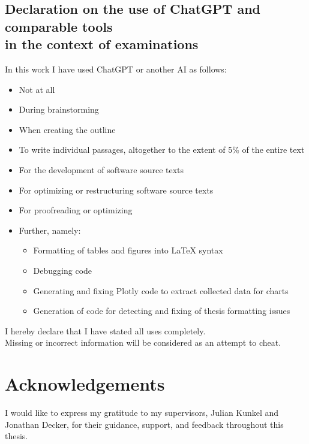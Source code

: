 \subsection*{Declaration on the use of ChatGPT and comparable tools\\ in the context of examinations}
\noindent In this work I have used ChatGPT or another AI as follows:
\begin{itemize}
	\item[\ccheckbox] Not at all
	\item[\ccheckmark] During brainstorming
	\item[\ccheckmark] When creating the outline
	\item[\ccheckmark] To write individual passages, altogether to the extent of 5\% of the entire text %
	\item[\ccheckmark] For the development of software source texts
	\item[\ccheckmark] For optimizing or restructuring software source texts
	\item[\ccheckmark] For proofreading or optimizing
	\item[\ccheckmark] Further, namely: 
    \begin{itemize}
        \item Formatting of tables and figures into \LaTeX {}{} syntax
        \item Debugging code
        \item Generating and fixing Plotly code to extract collected data for charts
        \item Generation of code for detecting and fixing of thesis formatting issues
    \end{itemize}
\end{itemize}
I hereby declare that I have stated all uses completely.\\
Missing or incorrect information will be considered as an attempt to cheat.


\vfill

\newpage


\section*{Acknowledgements}

I would like to express my gratitude to my supervisors, Julian Kunkel and
Jonathan Decker, for their guidance, support, and feedback throughout this
thesis.


